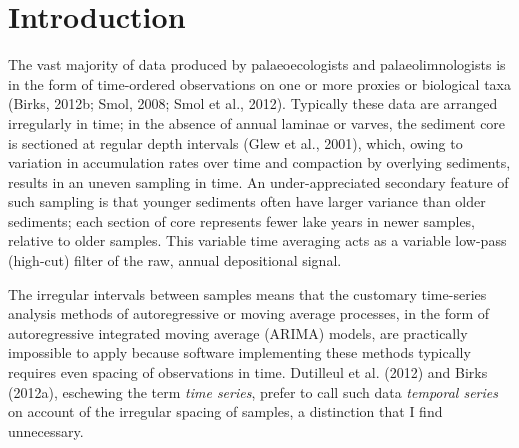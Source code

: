 \documentclass[12pt,]{article}
\begin{document}
\section{Introduction}\label{introduction}

The vast majority of data produced by palaeoecologists and
palaeolimnologists is in the form of time-ordered observations on one or
more proxies or biological taxa (Birks, 2012b; Smol, 2008; Smol et al.,
2012). Typically these data are arranged irregularly in time; in the
absence of annual laminae or varves, the sediment core is sectioned at
regular depth intervals (Glew et al., 2001), which, owing to variation
in accumulation rates over time and compaction by overlying sediments,
results in an uneven sampling in time. An under-appreciated secondary
feature of such sampling is that younger sediments often have larger
variance than older sediments; each section of core represents fewer
lake years in newer samples, relative to older samples. This variable
time averaging acts as a variable low-pass (high-cut) filter of the raw,
annual depositional signal.

The irregular intervals between samples means that the customary
time-series analysis methods of autoregressive or moving average
processes, in the form of autoregressive integrated moving average
(ARIMA) models, are practically impossible to apply because software
implementing these methods typically requires even spacing of
observations in time. Dutilleul et al. (2012) and Birks (2012a),
eschewing the term \emph{time series}, prefer to call such data
\emph{temporal series} on account of the irregular spacing of samples, a
distinction that I find unnecessary.
\end{document}
